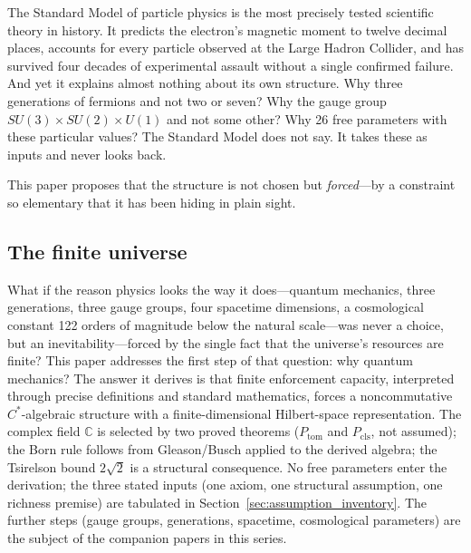 \documentclass[11pt]{article}
\theoremstyle{remark}
\begin{document}
The Standard Model of particle physics is the most precisely tested scientific theory in history.  It predicts the electron's magnetic moment to twelve decimal places, accounts for every particle observed at the Large Hadron Collider, and has survived four decades of experimental assault without a single confirmed failure.  And yet it explains almost nothing about its own structure.  Why three generations of fermions and not two or seven?  Why the gauge group $SU(3) \times SU(2) \times U(1)$ and not some other?  Why 26 free parameters with these particular values?  The Standard Model does not say.  It takes these as inputs and never looks back.

This paper proposes that the structure is not chosen but \emph{forced}---by a constraint so elementary that it has been hiding in plain sight.

\subsection{The finite universe}

What if the reason physics looks the way it does---quantum mechanics, three generations, three gauge groups, four spacetime dimensions, a cosmological constant 122 orders of magnitude below the natural scale---was never a choice, but an inevitability---forced by the single fact that the universe's resources are finite?  This paper addresses the first step of that question: why quantum mechanics?  The answer it derives is that finite enforcement capacity, interpreted through precise definitions and standard mathematics, forces a noncommutative $C^*$-algebraic structure with a finite-dimensional Hilbert-space representation.  The complex field $\mathbb{C}$ is selected by two proved theorems ($P_{\mathrm{tom}}$ and $P_{\mathrm{cls}}$, not assumed); the Born rule follows from Gleason/Busch applied to the derived algebra; the Tsirelson bound $2\sqrt{2}$ is a structural consequence.  No free parameters enter the derivation; the three stated inputs (one axiom, one structural assumption, one richness premise) are tabulated in Section~\ref{sec:assumption_inventory}.  The further steps (gauge groups, generations, spacetime, cosmological parameters) are the subject of the companion papers in this series.
\end{document}
